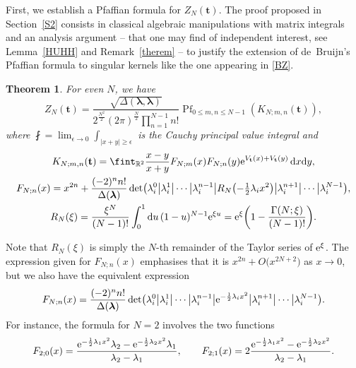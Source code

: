 \documentclass[pdftex]{sigma}
\numberwithin{equation}{section}
\newcommand{\dd}{\mathrm{d}}
\newtheorem{Theorem}{Theorem}[section]
\begin{document}
First, we establish a Pfaffian formula for $Z_N(\mathbf{t})$. The proof proposed in Section~\ref{S2} consists in classical algebraic manipulations with matrix integrals and an analysis argument -- that one may find of independent interest, see Lemma~\ref{HUHH} and Remark~\ref{therem} -- to justify the extension of de~Bruijn's Pfaffian formula \cite{deBruijn1955} to singular kernels like the one appearing in \eqref{BZ}.
\begin{Theorem}
\label{th:1} For even $N$, we have
\begin{equation}
\label{BZ} Z_N(\mathbf{t}) = \frac{\sqrt{\Delta(\boldsymbol{\lambda},\boldsymbol{\lambda})}}{2^{\frac{N^2}{2}} (2\pi)^{\frac{N}{2}}\prod_{n = 1}^{N - 1} n!} \operatorname{Pf}_{0 \leq m,n \leq N - 1}(K_{N;m,n}(\mathbf{t})),
\end{equation}
where $\fint = \lim_{\epsilon \rightarrow 0} \int_{|x + y| \geq \epsilon}$ is the Cauchy principal value integral and
\begin{gather*}
 K_{N;m,n}(\mathbf{t}) = \fint_{\mathbb{R}^2} \frac{x - y}{x + y} F_{N;m}(x)F_{N;n}(y) {\rm e}^{V_{\mathbf{t}}(x) + V_{\mathbf{t}}(y)}\,\dd x \dd y, \\
F_{N;n}(x) = x^{2n} + \frac{(-2)^n n!}{\Delta(\boldsymbol{\lambda})}\det\bigl(\lambda_i^0 \big| \lambda_i^1 \big| \cdots \big| \lambda_i^{n - 1} \big| R_N\bigl(-\tfrac{1}{2}\lambda_ix^2\bigr) \big| \lambda_i^{n + 1} \big| \cdots \big| \lambda_i^{N - 1}\bigr), \\
R_N(\xi) = \frac{\xi^N}{(N - 1)!} \int_{0}^{1} \dd u\, (1 - u)^{N - 1} {\rm e}^{\xi u} = {\rm e}^{\xi}\biggl(1 - \frac{\Gamma(N;\xi)}{(N - 1)!}\biggr).
\end{gather*}
\end{Theorem}

Note that $R_N(\xi)$ is simply the $N$-th remainder of the Taylor series of ${\rm e}^{\xi}$. The expression given for $F_{N;n}(x)$ emphasises that it is $x^{2n} + O\bigl(x^{2N + 2}\bigr)$ as $x \rightarrow 0$, but we also have the equivalent expression
\[
F_{N;n}(x) = \frac{(-2)^n n!}{\Delta(\boldsymbol{\lambda})} \det\bigl(\lambda_i^0 \big| \lambda_i^1 \big| \cdots \big| \lambda_i^{n - 1} \big| {\rm e}^{-\frac{1}{2}\lambda_i x^2} \big| \lambda_i^{n + 1} \big| \cdots \big| \lambda_i^{N - 1}\bigr).
\]
For instance, the formula for $N = 2$ involves the two functions
\[
F_{2;0}(x) = \frac{{\rm e}^{-\frac{1}{2}\lambda_1 x^2} \lambda_2 - {\rm e}^{-\frac{1}{2}\lambda_2 x^2}\lambda_1}{\lambda_2 - \lambda_1}, \qquad F_{2;1}(x) = 2 \frac{{\rm e}^{-\frac{1}{2}\lambda_1 x^2} - {\rm e}^{-\frac{1}{2}\lambda_2 x^2}}{\lambda_2 - \lambda_1} .
\]
\end{document}
